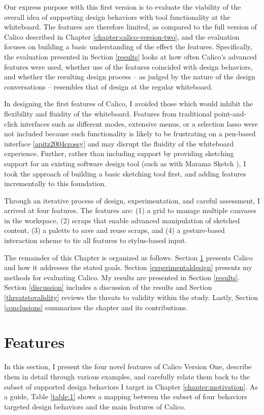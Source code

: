 \documentclass[12pt,fleqn]{ucithesis}
\begin{document}
Our express purpose with this first version is to evaluate the viability of the overall idea of supporting design behaviors with tool functionality at the whiteboard.  The features are therefore limited, as compared to the full version of Calico described in Chapter \ref{chapter:calico-version-two}, and the evaluation focuses on building a basic understanding of the effect the features.  Specifically, the evaluation presented in Section \ref{results} looks at how often Calico's advanced features were used, whether use of the features coincided with design behaviors, and whether the resulting design process -- as judged by the nature of the design conversations -- resembles that of design at the regular whiteboard.

In designing the first features of Calico, I avoided those which would inhibit the flexibility and fluidity of the whiteboard. Features from traditional point-and-click interfaces such as different modes, extensive menus, or a selection lasso were not included because such functionality is likely to be frustrating on a pen-based interface \ref{apitz2004crossy} and may disrupt the fluidity of the whiteboard experience. Further, rather than including support by providing sketching support for an existing software design tool (such as with Marama Sketch \cite{Grundy}), I took the approach of building a basic sketching tool first, and adding features incrementally to this foundation.

Through an iterative process of design, experimentation, and careful assessment, I arrived at four features. The features are: (1) a grid to manage multiple canvases in the workspace, (2) scraps that enable advanced manipulation of sketched content, (3) a palette to save and reuse scraps, and (4) a gesture-based interaction scheme to tie all features to stylus-based input.

The remainder of this Chapter is organized as follows. Section \ref{calico} presents Calico and how it addresses the stated goals. Section \ref{experimentaldesign} presents my methods for evaluating Calico. My results are presented in Section \ref{results}. Section \ref{discussion} includes a discussion of the results and Section \ref{threatstovalidity} reviews the threats to validity within the study. Lastly, Section \ref{conclusions} summarizes the chapter and its contributions.

\section{Features}
\label{calico}
In this section, I present the four novel features of Calico Version One, describe them in detail through various examples, and carefully relate them back to the subset of supported design behaviors I target in Chapter \ref{chapter:motivation}. As a guide, Table \ref{table:1} shows a mapping between the subset of four behaviors targeted design behaviors and the main features of Calico.
\end{document}
